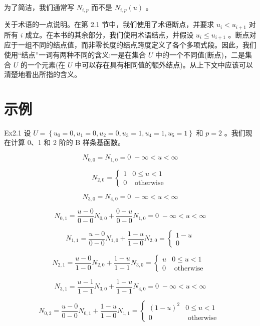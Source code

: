 \documentclass[../main.tex]{subfiles}
\begin{document}
为了简洁，我们通常写 \({N}_{i,p}\) 而不是 \({N}_{i,p}\left( u\right)\) 。

关于术语的一点说明。在第 2.1 节中，我们使用了术语断点，并要求 \({u}_{i} < {u}_{i + 1}\) 对所有 \(i\) 成立。在本书的其余部分，我们使用术语结点，并假设 \({u}_{i} \leq  {u}_{i + 1}\) 。断点对应于一组不同的结点值，而非零长度的结点跨度定义了各个多项式段。因此，我们使用“结点”一词有两种不同的含义:一是在集合 \(U\) 中的一个不同值(断点)，二是集合 \(U\) 的一个元素(在 \(U\) 中可以存在具有相同值的额外结点)。从上下文中应该可以清楚地看出所指的含义。

\section*{示例}

Ex2.1 设 \(U = \left\{  {{u}_{0} = 0,{u}_{1} = 0,{u}_{2} = 0,{u}_{3} = 1,{u}_{4} = 1,{u}_{5} = 1}\right\}\) 和 \(p = 2\) 。我们现在计算 0、1 和 2 阶的 B 样条基函数。

\[
{N}_{0,0} = {N}_{1,0} = 0\; - \infty  < u < \infty
\]

\[
{N}_{2,0} = \left\{  \begin{array}{ll} 1 & 0 \leq  u < 1 \\  0 & \text{ otherwise } \end{array}\right.
\]

\[
{N}_{3,0} = {N}_{4,0} = 0\; - \infty  < u < \infty
\]

\[
{N}_{0,1} = \frac{u - 0}{0 - 0}{N}_{0,0} + \frac{0 - u}{0 - 0}{N}_{1,0} = 0\; - \infty  < u < \infty
\]

\[
{N}_{1,1} = \frac{u - 0}{0 - 0}{N}_{1,0} + \frac{1 - u}{1 - 0}{N}_{2,0} = \left\{  \begin{matrix} 1 - u \\  0 \end{matrix}\right.
\]

\[
{N}_{2,1} = \frac{u - 0}{1 - 0}{N}_{2,0} + \frac{1 - u}{1 - 1}{N}_{3,0} = \left\{  \begin{array}{ll} u & 0 \leq  u < 1 \\  0 & \text{ otherwise } \end{array}\right.
\]

\[
{N}_{3,1} = \frac{u - 1}{1 - 1}{N}_{3,0} + \frac{1 - u}{1 - 1}{N}_{4,0} = 0\; - \infty  < u < \infty
\]

\[
{N}_{0,2} = \frac{u - 0}{0 - 0}{N}_{0,1} + \frac{1 - u}{1 - 0}{N}_{1,1} = \left\{  \begin{matrix} {\left( 1 - u\right) }^{2} & 0 \leq  u < 1 \\  0 & \text{ otherwise } \end{matrix}\right.
\]
\end{document}
